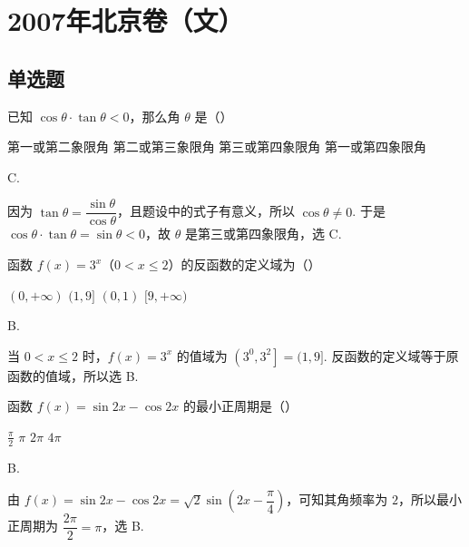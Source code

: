 \chapter{2007年北京卷（文）}
\section{单选题}
\begin{problem}
已知 \(\cos \theta \cdot \tan \theta < 0\)，那么角 \(\theta\) 是（\quad）

\choices
    {第一或第二象限角}
    {第二或第三象限角}
    {第三或第四象限角}
    {第一或第四象限角}
\end{problem}

\begin{answer}
C.
\end{answer}

\begin{solution}
因为 \(\tan\theta=\dfrac{\sin\theta}{\cos\theta}\)，且题设中的式子有意义，所以 \(\cos\theta\neq0\). 于是
\(\cos\theta\cdot\tan\theta=\sin\theta<0\)，故 \(\theta\) 是第三或第四象限角，选 C.
\end{solution}

\begin{problem}
函数 \( f(x) = 3^{x} \)（\(0 < x \leqslant 2\)）的反函数的定义域为（\quad）

\choices
    {\((0, +\infty)\)}
    {\((1, 9]\)}
    {\((0,1)\)}
    {\([9, +\infty)\)}
\end{problem}

\begin{answer}
B.
\end{answer}

\begin{solution}
当 \(0<x\leqslant2\) 时，\(f(x)=3^x\) 的值域为 \(\left(3^0,3^2\right]=(1,9]\). 反函数的定义域等于原函数的值域，所以选 B.
\end{solution}

\begin{problem}
函数 \( f(x) = \sin 2x - \cos 2x \) 的最小正周期是（\quad）

\choices
    {\(\frac{\pi}{2}\)}
    {\(\pi\)}
    {\(2\pi\)}
    {\(4\pi\)}
\end{problem}

\begin{answer}
B.
\end{answer}

\begin{solution}
由
\(f(x)=\sin2x-\cos2x=\sqrt2\sin\left(2x-\dfrac{\pi}{4}\right)\)，可知其角频率为 \(2\)，所以最小正周期为 \(\dfrac{2\pi}{2}=\pi\)，选 B.
\end{solution}

